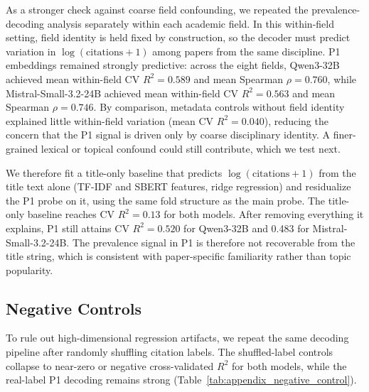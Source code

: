 \documentclass[11pt]{article}
\begin{document}
As a stronger check against coarse field confounding, we repeated the prevalence-decoding analysis separately within each academic field.
In this within-field setting, field identity is held fixed by construction, so the decoder must predict variation in $
\log(\mathrm{citations}+1)$ among papers from the same discipline. P1 embeddings remained strongly predictive: across the eight fields,
Qwen3-32B achieved mean within-field CV $R^2=0.589$ and mean Spearman $\rho=0.760$, while Mistral-Small-3.2-24B achieved mean within-field
CV $R^2=0.563$ and mean Spearman $\rho=0.746$. By comparison, metadata controls without field identity explained little within-field
variation (mean CV $R^2=0.040$), reducing the concern that the P1 signal is driven only by coarse disciplinary identity. A finer-grained lexical or topical confound could still contribute, which we test next.

We therefore fit a title-only baseline that predicts $\log(\mathrm{citations}+1)$ from the title text alone (TF-IDF and SBERT features, ridge regression) and residualize the P1 probe on it, using the same fold structure as the main probe. The title-only baseline reaches CV $R^2 = 0.13$ for both models. After removing everything it explains, P1 still attains CV $R^2 = 0.520$ for Qwen3-32B and 0.483 for Mistral-Small-3.2-24B. The prevalence signal in P1 is therefore not recoverable from the title string, which is consistent with paper-specific familiarity rather than topic popularity.

\subsection{Negative Controls}

To rule out high-dimensional regression artifacts, we repeat the same decoding
pipeline after randomly shuffling citation labels.  The shuffled-label controls
collapse to near-zero or negative cross-validated $R^2$ for both models, while
the real-label P1 decoding remains strong (Table~\ref{tab:appendix_negative_control}).

\setlength{\tabcolsep}{1pt}
\begin{table}[t]
\centering
\footnotesize
{}
\caption{Negative controls for prevalence decoding. Shuffling citation labels
removes the signal, indicating that prevalence decoding is not a generic artifact
of fitting high-dimensional embeddings.}
\label{tab:appendix_negative_control}
\end{table}
\end{document}
